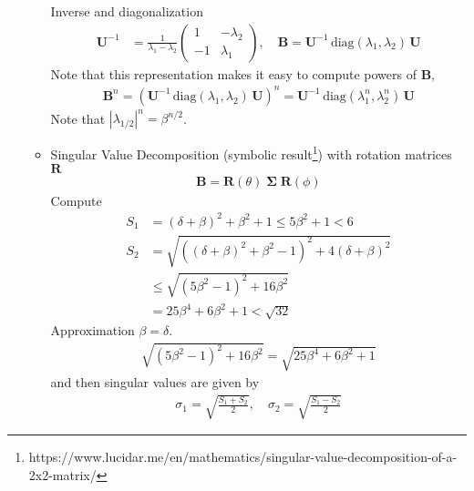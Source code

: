 \documentclass{article}
\newcommand{\mSigma}{{\mathbf \Sigma}}
\newcommand{\mR}{{\mathbf R}}
\newcommand{\mB}{{\mathbf B}}
\newcommand{\mU}{{\mathbf U}}
\begin{document}
\begin{enumerate}
\begin{itemize}
Inverse and diagonalization
\begin{align}
\mU^{-1} & = \frac{1}{\lambda_1-\lambda_2} \begin{pmatrix} 1 & -\lambda_2 \\ -1 & \lambda_1\end{pmatrix}, \quad 
\mB = \mU^{-1} \, \text{diag}(\lambda_1,\lambda_2) \, \mU
\end{align}
Note that this representation makes it easy to compute powers of $\mB$,
\begin{align}
\mB^n = (\mU^{-1} \, \text{diag}(\lambda_1,\lambda_2) \, \mU)^n = \mU^{-1} \, \text{diag}(\lambda_1^n,\lambda_2^n) \, \mU
\end{align}
Note that $|\lambda_{1/2}|^n = \beta^{n/2}$. 
\item Singular Value Decomposition (symbolic result\footnote{https://www.lucidar.me/en/mathematics/singular-value-decomposition-of-a-2x2-matrix/})  with rotation matrices $\mR$
\begin{align}
\mB = \mR(\theta)  \; \mSigma \; \mR(\phi)
\end{align}
Compute 
\begin{align}
S_1 & = (\delta + \beta)^2 + \beta^2 + 1 \le  5 \beta^2 +1 < 6 \\
S_2 & = \sqrt{((\delta+\beta)^2 + \beta^2 - 1)^2 + 4 ( \delta + \beta)^2} \\
& \le \sqrt{ (5\beta^2 -1)^2+ 16 \beta^2} \\
& = 25 \beta^4 + 6 \beta^2 +1 < \sqrt{32}
\end{align}
Approximation $\beta = \delta$. 
\begin{align}
\sqrt{(5\beta^2-1)^2 + 16 \beta^2} = \sqrt{25 \beta^4 + 6 \beta^2 +1}
\end{align}
\newpage
and then singular values are given by
\begin{align}
\sigma_1 = \sqrt{\frac{S_1+S_2}{2}}, \quad \sigma_2 = \sqrt{\frac{S_1- S_2}{2}}
\end{align}


\end{itemize}
\end{enumerate}
\end{document}

